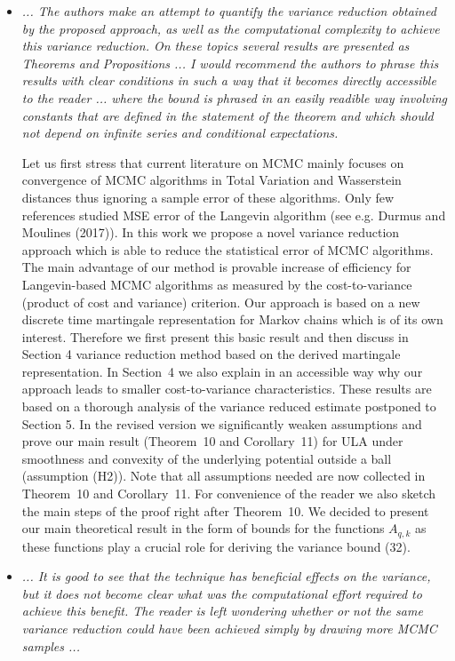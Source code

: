 \documentclass{article}%
\begin{document}
\begin{itemize}

\item \textit{... The authors make an attempt to quantify the variance reduction obtained by the proposed approach, as well as the computational complexity to achieve this variance reduction. On these topics several results are presented as Theorems and Propositions  ... I would recommend the authors to phrase this results with clear conditions in such a way that it becomes directly accessible to the reader ... where the bound is phrased in an easily readible way involving constants that are defined in the statement of the theorem and which should not depend on infinite series and conditional expectations.}
\par
Let us first stress that  current literature on MCMC  mainly focuses on  convergence of MCMC algorithms in Total Variation and Wasserstein distances thus  ignoring a sample error of these algorithms. Only few references studied MSE error of the Langevin algorithm (see e.g.  Durmus and  Moulines (2017)). In this work we propose a novel variance reduction approach which is able to reduce the statistical error of MCMC algorithms. The main advantage of our method is provable increase of efficiency for Langevin-based MCMC algorithms as measured by  the cost-to-variance (product of cost and variance) criterion. Our approach is based on a new discrete time martingale representation for Markov chains which is of its own interest. Therefore we first present this basic result and then discuss in Section 4 variance reduction method based on the derived martingale representation. In  Section~4 we  also explain in an accessible way why our approach leads to  smaller cost-to-variance characteristics. These results are based on a thorough analysis of the variance reduced estimate postponed to Section 5. In the revised version we significantly weaken  assumptions  and prove our main result (Theorem~10 and Corollary~11) for ULA under smoothness  and convexity of the underlying potential outside a ball (assumption  (H2)).   Note that all assumptions needed are now collected in Theorem~10 and Corollary~11. For convenience of the reader we also sketch the main steps of the proof right after 
Theorem~10. We decided to present our main theoretical result in the form of bounds for the functions $A_{q,k}$ as these functions play a crucial role for deriving  the variance bound (32). 
\item \textit{... It is good to see that the technique has beneficial effects on the variance, but it does not become clear what was the computational effort required to achieve this benefit. The reader is left wondering whether or not the same variance reduction could have been achieved simply by drawing more MCMC samples ...}

\end{itemize}
\end{document}
